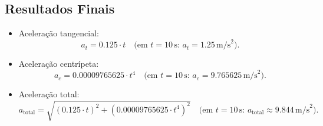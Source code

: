 \subsection*{Resultados Finais}
\begin{itemize}
    \item Aceleração tangencial:
    \[
    a_t = 0.125 \cdot t \quad \text{(em \(t = 10 \, \text{s}\): \(a_t = 1.25 \, \text{m/s}^2\))}.
    \]
    \item Aceleração centrípeta:
    \[
    a_c = 0.00009765625 \cdot t^4 \quad \text{(em \(t = 10 \, \text{s}\): \(a_c = 9.765625 \, \text{m/s}^2\))}.
    \]
    \item Aceleração total:
    \[
    a_{\text{total}} = \sqrt{\left(0.125 \cdot t\right)^2 + \left(0.00009765625 \cdot t^4\right)^2} \quad \text{(em \(t = 10 \, \text{s}\): \(a_{\text{total}} \approx 9.844 \, \text{m/s}^2\))}.
    \]
\end{itemize}
